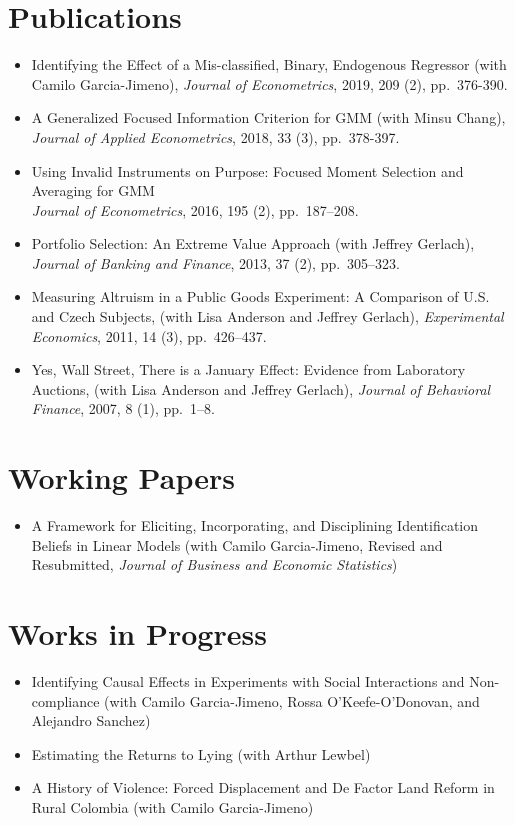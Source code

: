 \documentclass[line,overlapped]{myres}
\begin{document}
\begin{resume}
\section{\sc Publications}
\begin{itemize}
  \item Identifying the Effect of a Mis-classified, Binary, Endogenous Regressor (with Camilo Garcia-Jimeno), \emph{Journal of Econometrics}, 2019, 209 (2), pp.\ 376-390.
  \item A Generalized Focused Information Criterion for GMM (with Minsu Chang), \emph{Journal of Applied Econometrics}, 2018, 33 (3), pp.\ 378-397.
  \item Using Invalid Instruments on Purpose: Focused Moment Selection and Averaging for GMM\\ \emph{Journal of Econometrics}, 2016, 195 (2), pp.\ 187--208.
	\item Portfolio Selection: An Extreme Value Approach (with Jeffrey Gerlach), \emph{Journal of Banking and Finance}, 2013, 37 (2), pp.\ 305--323.
	\item Measuring Altruism in a Public Goods Experiment:  A Comparison of U.S. and Czech Subjects, (with Lisa Anderson and Jeffrey Gerlach), \emph{Experimental Economics}, 2011, 14 (3), pp.\ 426--437.
	\item Yes, Wall Street, There is a January Effect: Evidence from Laboratory Auctions, (with Lisa Anderson and Jeffrey Gerlach), \emph{Journal of Behavioral Finance}, 2007, 8 (1), pp.\ 1--8. 
\end{itemize}


\section{\sc Working Papers}
\begin{itemize}
  \item A Framework for Eliciting, Incorporating, and Disciplining Identification Beliefs in Linear Models (with Camilo Garcia-Jimeno, Revised and Resubmitted, \emph{Journal of Business and Economic Statistics})
\end{itemize}


\section{\sc Works in Progress}
\begin{itemize}
  \item Identifying Causal Effects in Experiments with Social Interactions and Non-compliance (with Camilo Garcia-Jimeno, Rossa O'Keefe-O'Donovan, and Alejandro Sanchez)
  \item Estimating the Returns to Lying (with Arthur Lewbel)
  \item A History of Violence: Forced Displacement and De Factor Land Reform in Rural Colombia (with Camilo Garcia-Jimeno)
\end{itemize}


\end{resume}
\end{document}
